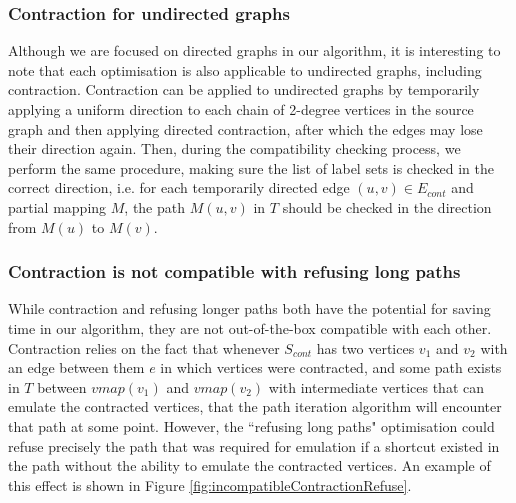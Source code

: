 \subsubsection{Contraction for undirected graphs}
Although we are focused on directed graphs in our algorithm, it is interesting to note that each optimisation is also applicable to undirected graphs, including contraction. Contraction can be applied to undirected graphs by temporarily applying a uniform direction to each chain of 2-degree vertices in the source graph and then applying directed contraction, after which the edges may lose their direction again. Then, during the compatibility checking process, we perform the same procedure, making sure the list of label sets is checked in the correct direction, i.e. for each temporarily directed edge $(u, v) \in E_{cont}$ and partial mapping $M$, the path $M(u, v)$ in $T$ should be checked in the direction from $M(u)$ to $M(v)$.



\subsubsection{Contraction is not compatible with refusing long paths}
While contraction and refusing longer paths both have the potential for saving time in our algorithm, they are not out-of-the-box compatible with each other. Contraction relies on the fact that whenever $S_{cont}$ has two vertices $v_1$ and $v_2$ with an edge between them $e$ in which vertices were contracted, and some path exists in $T$ between $\mathit{vmap}(v_1)$ and $\mathit{vmap}(v_2)$ with intermediate vertices that can emulate the contracted vertices, that the path iteration algorithm will encounter that path at some point. However, the ``refusing long paths" optimisation could refuse precisely the path that was required for emulation if a shortcut existed in the path without the ability to emulate the contracted vertices. An example of this effect is shown in Figure \ref{fig:incompatibleContractionRefuse}.

